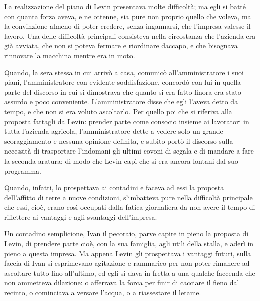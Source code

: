 \label{xxix-2} 

La realizzazione del piano di Levin presentava molte difficoltà; ma egli si batté con quanta forza aveva, e ne ottenne, sia pure non proprio quello che voleva, ma la convinzione almeno di poter credere, senza ingannarsi, che l'impresa valesse il lavoro. Una delle difficoltà principali consisteva nella circostanza che l'azienda era già avviata, che non si poteva fermare e riordinare daccapo, e che bisognava rinnovare la macchina mentre era in moto. 

Quando, la sera stessa in cui arrivò a casa, comunicò all'amministratore i suoi piani, l'amministratore con evidente soddisfazione, concordò con lui in quella parte del discorso in cui si dimostrava che quanto si era fatto finora era stato assurdo e poco conveniente. L'amministratore disse che egli l'aveva detto da tempo, e che non si era voluto ascoltarlo. Per quello poi che si riferiva alla proposta fattagli da Levin: prender parte come consocio insieme ai lavoratori in tutta l'azienda agricola, l'amministratore dette a vedere solo un grande scoraggiamento e nessuna opinione definita, e subito portò il discorso sulla necessità di trasportare l'indomani gli ultimi covoni di segala e di mandare a fare la seconda aratura; di modo che Levin capì che si era ancora lontani dal suo programma. 

Quando, infatti, lo prospettava ai contadini e faceva ad essi la proposta dell'affitto di terre a nuove condizioni, s'imbatteva pure nella difficoltà principale che essi, cioè, erano così occupati dalla fatica giornaliera da non avere il tempo di riflettere ai vantaggi e agli svantaggi dell'impresa. 

Un contadino semplicione, Ivan il pecoraio, parve capire in pieno la proposta di Levin, di prendere parte cioè, con la sua famiglia, agli utili della stalla, e aderì in pieno a questa impresa. Ma appena Levin gli prospettava i vantaggi futuri, sulla faccia di Ivan si esprimevano agitazione e rammarico per non poter rimanere ad ascoltare tutto fino all'ultimo, ed egli si dava in fretta a una qualche faccenda che non ammetteva dilazione: o afferrava la forca per finir di cacciare il fieno dal recinto, o cominciava a versare l'acqua, o a riassestare il letame. 

